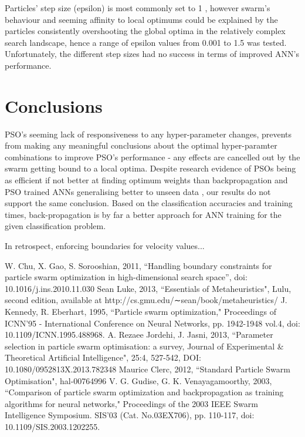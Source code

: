 \documentclass[12pt]{article}
\begin{document}
Particles' step size (epsilon) is most commonly set to 1 \cite{Luke}, however swarm's behaviour and seeming affinity to local optimums could be explained by the particles consistently overshooting the global optima in the relatively complex search landscape, hence a range of epsilon values from 0.001 to 1.5 was tested. Unfortunately, the different step sizes had no success in terms of improved ANN's performance.

\vspace{-1.5em}
\section{Conclusions}
\vspace{-1.5em}

PSO's seeming lack of responsiveness to any hyper-parameter changes, prevents from making any meaningful conclusions about the optimal hyper-paramter combinations to improve PSO's performance - any effects are cancelled out by the swarm getting bound to a local optima. Despite research evidence of PSOs being as efficient if not better at finding optimum weights than backpropagation and PSO trained ANNs generalising better to unseen data \cite{Kennedy}, our results do not support the same conclusion. Based on the classification accuracies and training times, back-propagation is by far a better approach for ANN training for the given classification problem.

In retrospect, enforcing boundaries for velocity values...

\vspace{-1.5em}
\begin{thebibliography}{10}

 W. Chu, X. Gao, S. Sorooshian, 2011, ``Handling boundary constraints for particle swarm optimization in high-dimensional search space'', doi: 10.1016/j.ins.2010.11.030
 Sean Luke, 2013, ``Essentials of Metaheuristics", Lulu, second edition, available at http://cs.gmu.edu/∼sean/book/metaheuristics/
 J. Kennedy, R. Eberhart, 1995, ``Particle swarm optimization," Proceedings of ICNN'95 - International Conference on Neural Networks,  pp. 1942-1948 vol.4, doi: 10.1109/ICNN.1995.488968.
 A. Rezaee Jordehi, J. Jasni, 2013, ``Parameter selection in particle swarm optimisation: a survey, Journal of Experimental \& Theoretical Artificial Intelligence", 25:4, 527-542, DOI: 10.1080/0952813X.2013.782348
 Maurice Clerc, 2012, ``Standard Particle Swarm Optimisation", hal-00764996
  V. G. Gudise, G. K. Venayagamoorthy, 2003, ``Comparison of particle swarm optimization and backpropagation as training algorithms for neural networks," Proceedings of the 2003 IEEE Swarm Intelligence Symposium. SIS'03 (Cat. No.03EX706), pp. 110-117, doi: 10.1109/SIS.2003.1202255.


\end{thebibliography}
\end{document}
